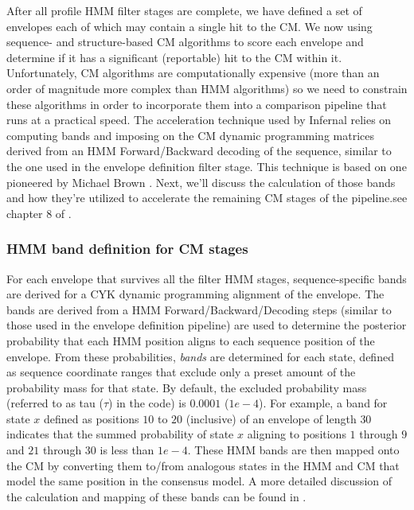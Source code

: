 \begin{sreoutput}
After all profile HMM filter stages are complete, we have defined a
set of envelopes each of which may contain a single hit to the CM. We
now using sequence- and structure-based CM algorithms to score each
envelope and determine if it has a significant (reportable) hit to the
CM within it. Unfortunately, CM algorithms are computationally
expensive (more than an order of magnitude more complex than HMM
algorithms) so we need to constrain these algorithms in order to
incorporate them into a comparison pipeline that runs at a practical
speed. The acceleration technique used by Infernal relies on computing
bands and imposing on the CM dynamic programming matrices derived from
an HMM Forward/Backward decoding of the sequence, similar to the one
used in the envelope definition filter stage. This technique is based
on one pioneered by Michael Brown \citep{Bronw00}. Next, we'll discuss the
calculation of those bands and how they're utilized to accelerate the
remaining CM stages of the pipeline.see chapter 8 of \citep{Nawrocki09}.

\subsubsection{HMM band definition for CM stages}

For each envelope that survives all the filter HMM stages,
sequence-specific bands are derived for a CYK dynamic programming
alignment of the envelope. The bands are derived from a HMM
Forward/Backward/Decoding steps (similar to those used in the envelope
definition pipeline) are used to determine the posterior probability
that each HMM position aligns to each sequence position of the
envelope. From these probabilities, \emph{bands} are determined for
each state, defined as sequence coordinate ranges that exclude only a
preset amount of the probability mass for that state. By default, the
excluded probability mass (referred to as tau ($\tau$) in the code) is
$0.0001$ ($1e-4$). For example, a band for state $x$ defined as
positions $10$ to $20$ (inclusive) of an envelope of length $30$
indicates that the summed probability of state $x$ aligning to
positions $1$ through $9$ and $21$ through $30$ is less than
$1e-4$. These HMM bands are then mapped onto the CM by converting them
to/from analogous states in the HMM and CM that model the same
position in the consensus model. A more detailed discussion of the
calculation and mapping of these bands can be found in
\citep{Nawrocki09b}.


\end{sreoutput}
